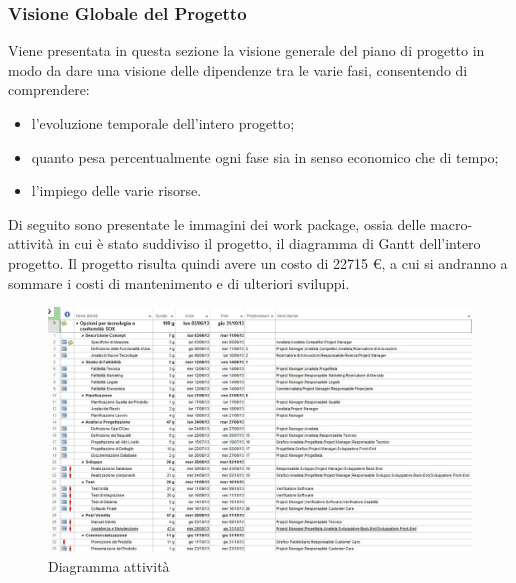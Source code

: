 \subsubsection{Visione Globale del Progetto}
Viene presentata in questa sezione la visione generale del piano di progetto in modo da
dare una visione delle dipendenze tra le varie fasi, consentendo di comprendere:
\begin{itemize}
\item l'evoluzione temporale dell'intero progetto;
\item quanto pesa percentualmente ogni fase sia in senso economico che di tempo;
\item l'impiego delle varie risorse.
\end{itemize}
Di seguito sono presentate le immagini dei work package, ossia delle macro-attività in cui
è stato suddiviso il progetto, il diagramma di Gantt dell'intero progetto.
Il progetto risulta quindi avere un costo di 22715 \euro{}, a cui si andranno a
sommare i costi di mantenimento e di ulteriori sviluppi.

\begin{figure}[H]
\begin{center}
\includegraphics[width=1\textwidth]{img/Ganttnuovo2.jpg}
\caption{Diagramma  attività}
\label{fig:Diagramma attività}
\end{center}
\end{figure}

